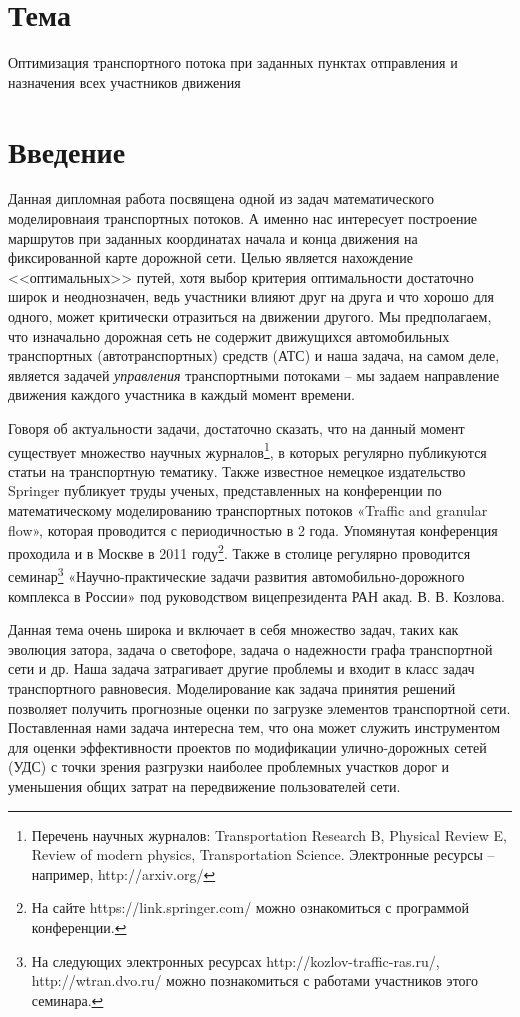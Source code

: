 \documentclass[12pt, a4paper]{article}
\begin{document}
\section*{Тема}
Оптимизация транспортного потока при заданных пунктах отправления и назначения всех участников движения

\section*{Введение}

Данная дипломная работа посвящена одной из задач математического моделировнаия транспортных потоков. А именно нас интересует построение маршрутов при заданных координатах начала и конца движения на фиксированной карте дорожной сети. Целью является нахождение <<оптимальных>> путей, хотя выбор критерия оптимальности достаточно широк и неоднозначен, ведь участники влияют друг на друга и что хорошо для одного, может критически отразиться на движении другого. Мы предполагаем, что изначально дорожная сеть не содержит движущихся автомобильных транспортных (автотранспортных) средств (АТС) и наша задача, на самом деле, является задачей \textit{управления} транспортными потоками -- мы задаем направление движения каждого участника в каждый момент времени.



Говоря об актуальности задачи, достаточно сказать, что на данный момент существует множество научных журналов\footnote{Перечень научных журналов: Transportation Research B, Physical Review E, Review of modern physics, Transportation Science. Электронные ресурсы -- например, http://arxiv.org/}, в которых регулярно публикуются статьи на транспортную тематику. Также известное немецкое издательство Springer публикует труды ученых, представленных на конференции по математическому моделированию транспортных потоков «Traffic and granular flow», которая проводится с периодичностью в 2 года. Упомянутая конференция проходила и в Москве в 2011 году\footnote{На сайте https://link.springer.com/ можно ознакомиться с программой конференции.}. Также в столице регулярно проводится семинар\footnote{На следующих электронных ресурсах http://kozlov-traffic-ras.ru/, http://wtran.dvo.ru/ можно познакомиться с работами участников этого семинара.} «Научно-практические задачи развития автомобильно-дорожного комплекса в России» под руководством вицепрезидента РАН акад. В. В. Козлова.

Данная тема очень широка и включает в себя множество задач, таких как эволюция затора, задача о светофоре, задача о надежности графа транспортной сети и др. Наша задача затрагивает другие проблемы и входит в класс задач транспортного равновесия. Моделирование как задача принятия решений позволяет получить прогнозные оценки по загрузке элементов транспортной сети. Поставленная нами задача интересна тем, что она может служить инструментом для оценки эффективности проектов по модификации улично-дорожных сетей (УДС) с точки зрения разгрузки наиболее проблемных участков дорог и уменьшения общих затрат на передвижение пользователей сети.
\end{document}
